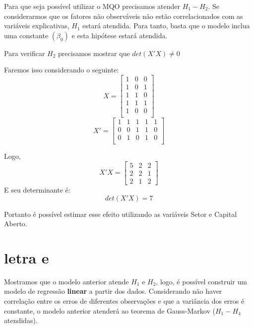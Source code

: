 Para que seja possível utilizar o MQO precisamos atender \(H_{1}-H_{2}\). Se considerarmos que os fatores não observáveis não estão correlacionados com as variáveis explicativas, \(H_{1}\) estará atendida. Para tanto, basta que o modelo inclua uma constante \((\beta_{0})\) e esta hipótese estará atendida.

Para verificar \(H_{2}\) precisamos mostrar que \(det(X'X) \neq 0\)

Faremos isso considerando o seguinte:
\[ X =
    \begin{bmatrix}
         1 & 0 & 0 \\
         1 & 0 & 1 \\
         1 & 1 & 0 \\
         1 & 1 & 1 \\
         1 & 0 & 0 \\
    \end{bmatrix}
\]
\[ X' =
    \begin{bmatrix}
         1 & 1 & 1 & 1 & 1 \\
         0 & 0 & 1 & 1 & 0\\
         0 & 1 & 0 & 1 & 0\\
    \end{bmatrix}
\]

Logo,
\[ X'X = 
    \begin{bmatrix}
        5 & 2 & 2 \\
        2 & 2 & 1 \\
        2 & 1 & 2
    \end{bmatrix}
\]
E seu determinante é:
\[ det(X'X) = 7\]

Portanto é possível estimar esse efeito utilizando as variáveis Setor e Capital Aberto.

\section*{letra e}
Mostramos que o modelo anterior atende \(H_{1}\) e \(H_{2}\), logo, é possível construir um modelo de regressão \textbf{linear} a partir dos dados. Considerando não haver correlação entre os erros de diferentes observações e que a variância dos erros é constante, o modelo anterior atenderá ao teorema de Gauss-Markov (\(H_{1}-H_{4}\) atendidas).


